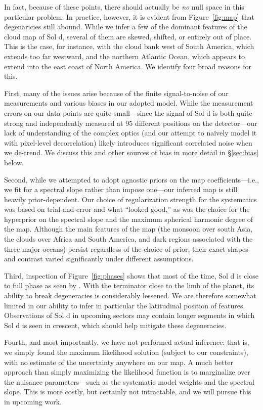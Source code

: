 \documentclass[modern]{aastex62}
\begin{document}
In fact, because of these points, there should actually be \emph{no} null space 
in this particular problem. In practice, however, it is evident from
Figure~\ref{fig:map} that degenaricies still abound. While we infer a few of the
dominant features of the cloud map of Sol d, several of them are skewed, 
shifted, or entirely out of place. This is the case, for instance, with
the cloud bank west of South America, which extends too far westward, and
the northern Atlantic Ocean, which appears to extend into the east coast of
North America. We identify four broad reasons for this.

First, many of the issues arise because
of the finite signal-to-noise of our measurements and various biases in
our adopted model. While the measurement errors on our data points are
quite small---since the signal of Sol d is both quite strong and independently
measured at 95 different positions on the detector---our lack of understanding
of the complex optics (and our
attempt to na{\"i}vely model it with pixel-level decorrelation) likely
introduces significant correlated noise when we de-trend. We discuss this
and other sources of bias in more detail in \S\ref{sec:bias} below.

Second, while we attempted to adopt agnostic priors on the map coefficients---i.e.,
we fit for a spectral slope rather than impose one---our inferred map is still 
heavily prior-dependent. Our choice of regularization strength for the systematics
was based on trial-and-error and what ``looked good,'' as was the choice for the 
hyperprior on the spectral
slope and the maximum spherical harmonic degree of the map. Although the main
features of the map (the monsoon over south Asia, the clouds over Africa and
South America, and dark regions associated with the three major oceans) persist
regardless of the choice of prior, their exact shapes and contrast varied
significantly under different assumptions.

Third, inspection of Figure~\ref{fig:phases} shows that most of the time, Sol
d is close to full phase as seen by \TESS.
With the terminator close to the limb
of the planet, its ability to break degeneracies is considerably lessened.
We are therefore somewhat limited in our ability to infer in particular the
latitudinal position of features. Observations of Sol d in upcoming
sectors may contain longer segments in which Sol d is seen in crescent,
which should help mitigate these degeneracies.

Fourth, and most importantly, we have not performed actual inference: that is, 
we simply found the maximum likelihood solution (subject to our constraints),
with no estimate of the uncertainty anywhere on our map. A much better
approach than simply maximizing the likelihood function is to marginalize
over the nuisance parameters---such as the systematic model weights and the spectral
slope. This is more costly, but certainly not intractable, and we will
pursue this in upcoming work.
\end{document}
